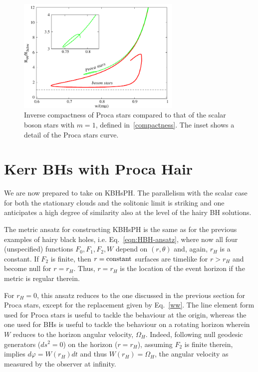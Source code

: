\begin{figure}[h!]
  \begin{center}
    \includegraphics[width=0.7\textwidth]{papers/Proca/w-Comp-Schw.pdf}  
         \end{center}
 \caption{Inverse compactness of Proca stars compared to that of the scalar boson stars with $m=1$, defined in~\eqref{compactness}. The inset shows a detail of the Proca stars curve.}
  \label{compactnessfig}
\end{figure}

\section{Kerr BHs with Proca Hair} 
\label{sec_kbhsph}

We are now prepared to take on KBHsPH.
The parallelism with the scalar case for both the stationary clouds and the solitonic limit is striking and one anticipates a high degree of similarity also at the level of the hairy BH solutions. 

The metric ansatz for constructing KBHsPH is the same as for the previous examples of hairy black holes, i.e. Eq.~\eqref{eqn:HBH-ansatz}, where now all four (unspecified) functions $F_0,F_1,F_2,W$ depend on $(r,\theta)$ and, again, $r_H$ is a constant.
If $F_2$ is finite, then $r={\rm constant}$ surfaces are timelike for $r>r_H$ and become null for $r=r_H$.
Thus, $r=r_H$ is the location of the event horizon if the metric is regular therein.

For $r_H=0$, this ansatz reduces to the one discussed in the previous section for Proca stars, except for the replacement given by Eq.~\eqref{ww}.
The line element form used for Proca stars is useful to tackle the behaviour at the origin, whereas the one used for BHs is useful to tackle the behaviour on a rotating horizon wherein $W$ reduces to the horizon angular velocity, $\Omega_H$.
Indeed, following null geodesic generators ($ds^2=0$) on the horizon ($r=r_H$), assuming $F_2$ is finite therein, implies $d\varphi=W(r_H)dt$ and thus $W(r_H)=\Omega_H$, the angular velocity as measured by the observer at infinity.

